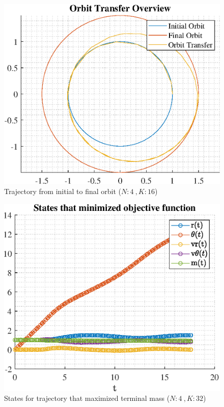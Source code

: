 \documentclass[]{article}
\begin{document}
\begin{figure}
	\centering
	\includegraphics[scale=0.75]{orbit_N4_K16_C2_mf.eps}
	\caption{Trajectory from initial to final orbit (\(N:4\ , K:16\))}
	\label{fig:orbit_N4_K16_C2_mf}
\end{figure}
\begin{figure}
	\centering
	\includegraphics[scale=0.75]{states_N4_K32_C2_mf.eps}
	\caption{States for trajectory that maximized terminal mass (\(N:4\ , K:32\))}
	\label{fig:states_N4_K32_C2_mf}
\end{figure}
\end{document}

